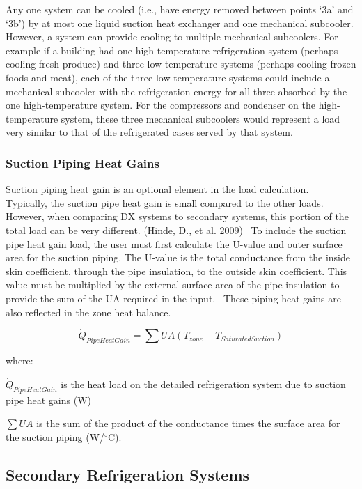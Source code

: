 Any one system can be cooled (i.e., have energy removed between points `3a' and `3b') by at most one liquid suction heat exchanger and one mechanical subcooler. However, a system can provide cooling to multiple mechanical subcoolers. For example if a building had one high temperature refrigeration system (perhaps cooling fresh produce) and three low temperature systems (perhaps cooling frozen foods and meat), each of the three low temperature systems could include a mechanical subcooler with the refrigeration energy for all three absorbed by the one high-temperature system. For the compressors and condenser on the high-temperature system, these three mechanical subcoolers would represent a load very similar to that of the refrigerated cases served by that system.

\subsubsection{Suction Piping Heat Gains}\label{suction-piping-heat-gains}

Suction piping heat gain is an optional element in the load calculation.~ Typically, the suction pipe heat gain is small compared to the other loads.~ However, when comparing DX systems to secondary systems, this portion of the total load can be very different. (Hinde, D., et al. 2009) ~To include the suction pipe heat gain load, the user must first calculate the U-value and outer surface area for the suction piping. The U-value is the total conductance from the inside skin coefficient, through the pipe insulation, to the outside skin coefficient. This value must be multiplied by the external surface area of the pipe insulation to provide the sum of the UA required in the input.~ These piping heat gains are also reflected in the zone heat balance.

\begin{equation}
{\dot Q_{PipeHeatGain}} = \sum U A (T_{zone} - T_{SaturatedSuction})
\end{equation}

where:

\({\dot Q_{PipeHeatGain}}\)  is the heat load on the detailed refrigeration system due to suction pipe heat gains (W)

\(\sum U A\)  is the sum of the product of the conductance times the surface area for the suction piping (W/\(^{\circ}\)C).

\subsection{Secondary Refrigeration Systems}\label{secondary-refrigeration-systems}

